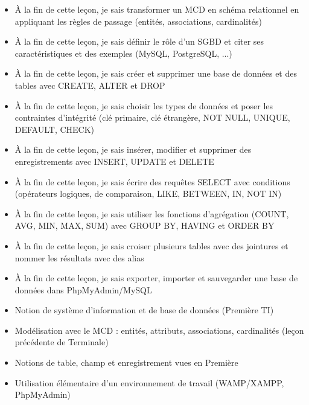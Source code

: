 \documentclass[11pt]{article}
\begin{document}
\begin{objectifs}
\begin{itemize}
\item À la fin de cette leçon, je sais transformer un MCD en schéma relationnel en appliquant les règles de passage (entités, associations, cardinalités)
\item À la fin de cette leçon, je sais définir le rôle d'un SGBD et citer ses caractéristiques et des exemples (MySQL, PostgreSQL, ...)
\item À la fin de cette leçon, je sais créer et supprimer une base de données et des tables avec CREATE, ALTER et DROP
\item À la fin de cette leçon, je sais choisir les types de données et poser les contraintes d'intégrité (clé primaire, clé étrangère, NOT NULL, UNIQUE, DEFAULT, CHECK)
\item À la fin de cette leçon, je sais insérer, modifier et supprimer des enregistrements avec INSERT, UPDATE et DELETE
\item À la fin de cette leçon, je sais écrire des requêtes SELECT avec conditions (opérateurs logiques, de comparaison, LIKE, BETWEEN, IN, NOT IN)
\item À la fin de cette leçon, je sais utiliser les fonctions d'agrégation (COUNT, AVG, MIN, MAX, SUM) avec GROUP BY, HAVING et ORDER BY
\item À la fin de cette leçon, je sais croiser plusieurs tables avec des jointures et nommer les résultats avec des alias
\item À la fin de cette leçon, je sais exporter, importer et sauvegarder une base de données dans PhpMyAdmin/MySQL
\end{itemize}
\end{objectifs}

\begin{prerequis}
\begin{itemize}
\item Notion de système d'information et de base de données (Première TI)
\item Modélisation avec le MCD : entités, attributs, associations, cardinalités (leçon précédente de Terminale)
\item Notions de table, champ et enregistrement vues en Première
\item Utilisation élémentaire d'un environnement de travail (WAMP/XAMPP, PhpMyAdmin)
\end{itemize}
\end{prerequis}
\end{document}
